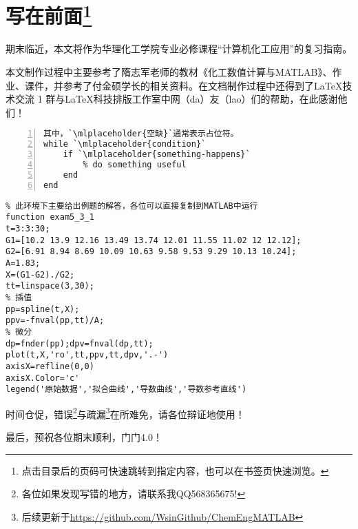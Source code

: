 \chapter*{写在前面\footnote{点击目录后的页码可快速跳转到指定内容，也可以在书签页快速浏览。}}
期末临近，本文将作为华理化工学院专业必修课程“计算机化工应用”的复习指南。

本文制作过程中主要参考了隋志军老师的教材《化工数值计算与MATLAB》、作业、课件，并参考了付金硕学长的相关资料。在文档制作过程中还得到了\LaTeX{}技术交流 1 群与\LaTeX{}科技排版工作室中网（da）友（lao）们的帮助，在此感谢他们！
\begin{lstlisting}[frame=single,numbers=left]
% 此环境下主要介绍函数的写法
其中，`\mlplaceholder{空缺}`通常表示占位符。
while `\mlplaceholder{condition}`
    if `\mlplaceholder{something-happens}`
        % do something useful
    end
end
\end{lstlisting}

\begin{lstlisting}
% 此环境下主要给出例题的解答，各位可以直接复制到MATLAB中运行
function exam5_3_1
t=3:3:30;
G1=[10.2 13.9 12.16 13.49 13.74 12.01 11.55 11.02 12 12.12];
G2=[6.91 8.94 8.69 10.09 10.63 9.58 9.53 9.29 10.13 10.24];
A=1.83;
X=(G1-G2)./G2;
tt=linspace(3,30);
% 插值
pp=spline(t,X);
ppv=-fnval(pp,tt)/A;
% 微分
dp=fnder(pp);dpv=fnval(dp,tt);
plot(t,X,'ro',tt,ppv,tt,dpv,'.-')
axisX=refline(0,0)
axisX.Color='c'
legend('原始数据','拟合曲线','导数曲线','导数参考直线')
\end{lstlisting}

时间仓促，错误\footnote{各位如果发现写错的地方，请联系我QQ568365675!}与疏漏\footnote{后续更新于\href{https://github.com/WsinGithub/ChemEngMATLAB}{https://github.com/WsinGithub/ChemEngMATLAB}}在所难免，请各位辩证地使用！

最后，预祝各位期末顺利，门门4.0！
